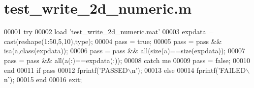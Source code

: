 \hypertarget{test__write__2d__numeric_8m_source}{}\section{test\+\_\+write\+\_\+2d\+\_\+numeric.\+m}
\label{test__write__2d__numeric_8m_source}

\begin{DoxyCode}
00001 \textcolor{keywordflow}{try}
00002     load \textcolor{stringliteral}{'test\_write\_2d\_numeric.mat'}
00003     expdata = cast(reshape(1:50,5,10),type);
00004     pass = \textcolor{keyword}{true};
00005     pass = pass && isa(a,\textcolor{keyword}{class}(expdata));
00006     pass = pass && all(size(a)==size(expdata));
00007     pass = pass && all(a(:)==expdata(:));
00008 \textcolor{keywordflow}{catch} me
00009     pass = \textcolor{keyword}{false};
00010 end
00011 \textcolor{keywordflow}{if} pass
00012     fprintf(\textcolor{stringliteral}{'PASSED\(\backslash\)n'});
00013 \textcolor{keywordflow}{else}
00014     fprintf(\textcolor{stringliteral}{'FAILED\(\backslash\)n'});
00015 end
00016 exit;
\end{DoxyCode}
